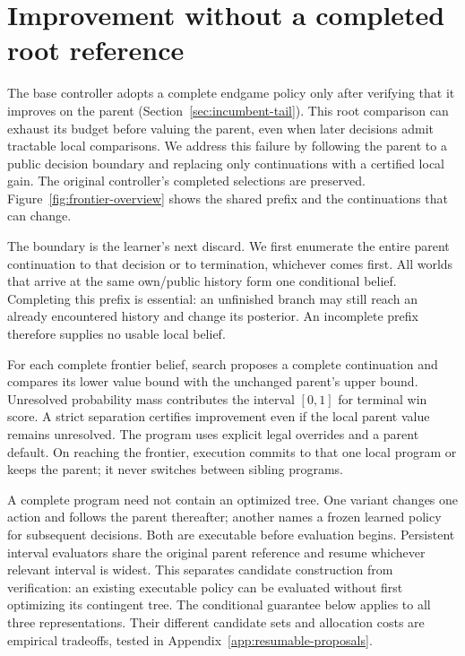 \section{Improvement without a completed root reference}
\label{sec:frontier}
The base controller adopts a complete endgame policy only after verifying
that it improves on the parent (Section~\ref{sec:incumbent-tail}). This root
comparison can exhaust its budget before valuing the parent, even
when later decisions admit tractable local comparisons. We address this
failure by following the parent to a public decision boundary and replacing
only continuations with a certified local gain. The original controller's
completed selections are preserved. Figure~\ref{fig:frontier-overview} shows
the shared prefix and the continuations that can change.

The boundary is the learner's next discard. We first enumerate the entire
parent continuation to that decision or to termination, whichever comes first.
All worlds that arrive at the same own/public history form one conditional
belief. Completing this prefix is essential: an unfinished branch may still
reach an already encountered history and change its posterior. An incomplete
prefix therefore supplies no usable local belief.

For each complete frontier belief, search proposes a complete continuation and
compares its lower value bound with the unchanged parent's upper bound.
Unresolved probability mass contributes the interval $[0,1]$ for terminal
win score. A strict separation certifies improvement even if the local parent
value remains unresolved. The program uses explicit legal overrides and a
parent default. On reaching the frontier, execution commits to that one local
program or keeps the parent; it never switches between sibling programs.

A complete program need not contain an optimized tree. One variant changes
one action and follows the parent thereafter; another names a frozen learned
policy for subsequent decisions. Both are executable before evaluation begins.
Persistent interval evaluators share the original parent reference and resume
whichever relevant interval is widest. This separates candidate construction
from verification: an existing executable policy can be evaluated without first
optimizing its contingent tree. The conditional guarantee below applies to
all three representations. Their different candidate sets and allocation costs
are empirical tradeoffs, tested in Appendix~\ref{app:resumable-proposals}.

